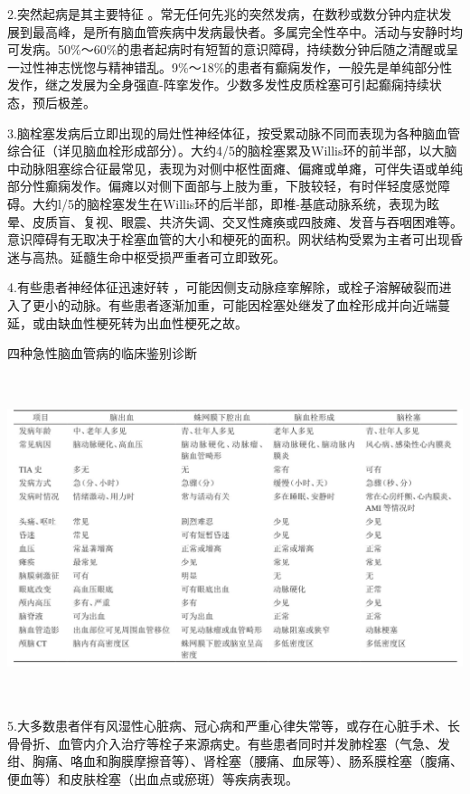 2.突然起病是其主要特征
。常无任何先兆的突然发病，在数秒或数分钟内症状发展到最高峰，是所有脑血管疾病中发病最快者。多属完全性卒中。活动与安静时均可发病。50\%～60\%的患者起病时有短暂的意识障碍，持续数分钟后随之清醒或呈一过性神志恍惚与精神错乱。9\%～18\%的患者有癫痫发作，一般先是单纯部分性发作，继之发展为全身强直-阵挛发作。少数多发性皮质栓塞可引起癫痫持续状态，预后极差。

3.脑栓塞发病后立即出现的局灶性神经体征，按受累动脉不同而表现为各种脑血管综合征（详见脑血栓形成部分）。大约4/5的脑栓塞累及Willis环的前半部，以大脑中动脉阻塞综合征最常见，表现为对侧中枢性面瘫、偏瘫或单瘫，可伴失语或单纯部分性癫痫发作。偏瘫以对侧下面部与上肢为重，下肢较轻，有时伴轻度感觉障碍。大约l/5的脑栓塞发生在Willis环的后半部，即椎-基底动脉系统，表现为眩晕、皮质盲、复视、眼震、共济失调、交叉性瘫痪或四肢瘫、发音与吞咽困难等。意识障碍有无取决于栓塞血管的大小和梗死的面积。网状结构受累为主者可出现昏迷与高热。延髓生命中枢受损严重者可立即致死。

4.有些患者神经体征迅速好转
，可能因侧支动脉痉挛解除，或栓子溶解破裂而进入了更小的动脉。有些患者逐渐加重，可能因栓塞处继发了血栓形成并向近端蔓延，或由缺血性梗死转为出血性梗死之故。

\begin{table}[htbp]
\centering
\caption{四种急性脑血管病的临床鉴别诊断}
\label{tab84-2}
\includegraphics[width=6.625in,height=3.75in]{./images/Image00371.jpg}
\end{table}

5.大多数患者伴有风湿性心脏病、冠心病和严重心律失常等，或存在心脏手术、长骨骨折、血管内介入治疗等栓子来源病史。有些患者同时并发肺栓塞（气急、发绀、胸痛、咯血和胸膜摩擦音等）、肾栓塞（腰痛、血尿等）、肠系膜栓塞（腹痛、便血等）和皮肤栓塞（出血点或瘀斑）等疾病表现。

